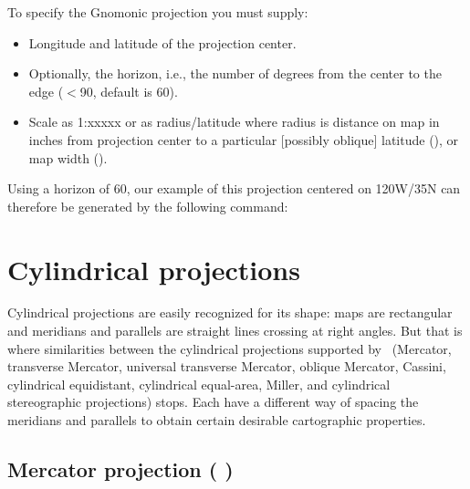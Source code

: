 To specify the Gnomonic projection you must supply:

\begin{itemize}
\item Longitude and latitude of the projection center.
\item Optionally, the horizon, i.e., the number of degrees from the center to the edge ($<$90\DS, default is 60\DS).
\item Scale as 1:xxxxx or as radius/latitude where
radius is distance on map in inches from projection center to
a particular [possibly oblique] latitude (), or map
width ().
\end{itemize}

Using a horizon of 60\DS , our example of this projection
centered on 120\DS W/35\DS N can therefore be generated by
the following  command:





\clearpage
\section{Cylindrical projections}

Cylindrical projections are easily recognized for its shape: maps are rectangular and meridians and parallels are straight lines crossing at right angles. But that is where similarities between the cylindrical projections supported by \GMT\ (Mercator, transverse Mercator, universal transverse Mercator, oblique Mercator, Cassini, cylindrical equidistant, cylindrical equal-area, Miller, and cylindrical stereographic projections) stops. Each have a different way of spacing the meridians and parallels to obtain certain desirable cartographic properties.

\subsection{Mercator projection ( )}


